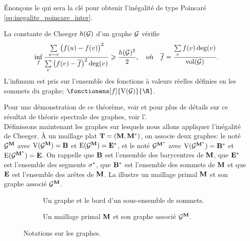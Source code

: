 \noindent Énonçons le  qui sera la clé pour obtenir l'inégalité de type Poincaré  \ref{eq:inegalite_poincare_inter}. 

\begin{theo} \label{theo:cheeger_inequality}
La constante de Cheeger $h(\mathcal{G})$ d'un graphe $\mathcal{G}$ vérifie
\[
\inf_f \frac{\sum\limits_{u \sim v} \big( f(u) - f(v) \big)^2}{\sum\limits_v \big( f(v) - \overline{f} \big)^2 \operatorname{deg}(v)}
\geqslant
\frac{h(\mathcal{G})^2}{2},
\quad
\text{où}
\quad
\overline{f} = \displaystyle\frac{\sum\limits_v f(v) \operatorname{deg}(v)}{\operatorname{vol}(\mathcal{G})}.
\]
L'infimum est pris sur l'ensemble des fonctions à valeurs réelles définies en les sommets du graphe; $\fonctionens[f]{\vertices(\graphe)}{\R}$.
\end{theo}
Pour une démonstration de ce théorème, voir \cite[Section 3]{ji_fourth_2010} et pour plus de détails sur ce résultat de théorie spectrale des graphes, voir l'. \\

Définissons maintenant les graphes sur lesquels nous allons appliquer l'inégalité de Cheeger. À un maillage \ddfv plat $\mathbf{T} = (\mathbf{M}, {\mathbf{M}^\ast})$, on associe deux graphes: le  noté $\mathcal{G}^{\mathbf{M}}$ avec $\mathrm{V}(\mathcal{G}^{\mathbf{M}}) = \mathbf{B}$ et $\mathrm{E}(\mathcal{G}^{\mathbf{M}}) = {\mathbf{E}^\ast}$, et le  noté $\mathcal{G}^{\mathbf{M}^\ast}$ avec $\mathrm{V}(\mathcal{G}^{\mathbf{M}^\ast}) = {\mathbf{B}^\ast}$ et $\mathrm{E}(\mathcal{G}^{\mathbf{M}^\ast}) = \mathbf{E}$. On rappelle que $\mathbf{B}$ est l'ensemble des barycentres de $\mathbf{M}$, que ${\mathbf{E}^\ast}$ est l'ensemble des segments ${\sigma^\ast}$, que ${\mathbf{B}^\ast}$ est l'ensemble des sommets de $\mathbf{M}$ et que $\mathbf{E}$ est l'ensemble des arêtes de $\mathbf{M}$. La  illustre un maillage primal $\mathbf{M}$ et son graphe associé $\mathcal{G}^{\mathbf{M}}$.

\begin{figure}[H]
\centering
\begin{subfigure}[t]{.5\textwidth}
    \centering
    
    \caption{Un graphe et le bord d'un sous-ensemble de sommets.}
    \label{fig:graphe}
\end{subfigure}%
\begin{subfigure}[t]{.5\textwidth}
    \centering
    
    \caption{Un maillage primal $\mathbf{M}$ et son graphe associé $\mathcal{G}^{\mathbf{M}}$.}
    \label{fig:graphe_ddfv}
\end{subfigure}
\caption{Notations sur les graphes.}
\end{figure}


